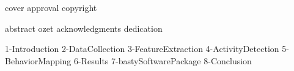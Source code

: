 \documentclass[12pt, leqno, oneside, a4paper]{book}
\begin{document}
{cover}
{approval}
{copyright}

\clearpage {} \setcounter{page}{3}
{abstract}
{ozet}
{acknowledgments}
{dedication}

\tableofcontents
\listoffigures
\listoftables

\clearpage {} \setcounter{page}{1} \onehalfspacing
{1-Introduction}
{2-DataCollection}
{3-FeatureExtraction}
{4-ActivityDetection}
{5-BehaviorMapping}
{6-Results}
{7-bastySoftwarePackage}
{8-Conclusion}
\singlespace
{}

\end{document}
